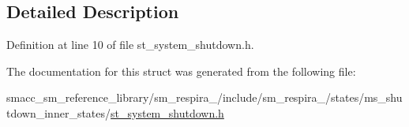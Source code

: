 \subsection{Detailed Description}


Definition at line 10 of file st\+\_\+system\+\_\+shutdown.\+h.



The documentation for this struct was generated from the following file\+:\begin{DoxyCompactItemize}
\item 
smacc\+\_\+sm\+\_\+reference\+\_\+library/sm\+\_\+respira\+\_/include/sm\+\_\+respira\+\_/states/ms\+\_\+shutdown\+\_\+inner\+\_\+states/\hyperlink{st__system__shutdown_8h}{st\+\_\+system\+\_\+shutdown.\+h}\end{DoxyCompactItemize}

